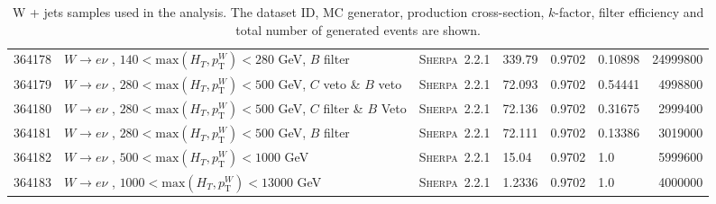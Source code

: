 \begin{table}[!htb]
{\begin{tabular}{llllllr}
      364178 & $W \to e\nu $ , $140<\text{max}(H_T,p_{\text{T}}^W)<280$ GeV, $B$ filter & \textsc{Sherpa}~2.2.1 &               339.79         & 0.9702& 0.10898 &  24999800\\
      364179 & $W \to e\nu $ , $280<\text{max}(H_T,p_{\text{T}}^W)<500$ GeV, $C$ veto \& $B$ veto & \textsc{Sherpa}~2.2.1 &     72.093         & 0.9702& 0.54441 &  4998800 \\
      364180 & $W \to e\nu $ , $280<\text{max}(H_T,p_{\text{T}}^W)<500$ GeV,  $C$ filter \& $B$ Veto & \textsc{Sherpa}~2.2.1 &  72.136         & 0.9702& 0.31675 &  2999400 \\
      364181 & $W \to e\nu $ , $280<\text{max}(H_T,p_{\text{T}}^W)<500$ GeV, $B$ filter & \textsc{Sherpa}~2.2.1 &               72.111         & 0.9702& 0.13386 &  3019000 \\
      364182 & $W \to e\nu $ , $500<\text{max}(H_T,p_{\text{T}}^W)<1000$ GeV                      & \textsc{Sherpa}~2.2.1 &     15.04          & 0.9702& 1.0 	&  5999600 \\
      364183 & $W \to e\nu $ , $1000<\text{max}(H_T,p_{\text{T}}^W)<13000$ GeV                    & \textsc{Sherpa}~2.2.1 &     1.2336         & 0.9702& 1.0 	&  4000000 \\
      \bottomrule
    \end{tabular}
  }
  \caption{W + jets samples used in the analysis. The dataset ID, MC generator,
    production cross-section, $k$-factor, filter efficiency and total number of
    generated events are shown.}
  \label{tabular:mc_samples_Wjets}
\end{table}